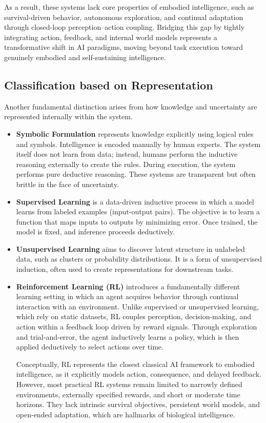 \documentclass[12pt]{article}
\begin{document}
As a result, these systems lack core properties of embodied intelligence, such as survival-driven behavior, autonomous exploration, and continual adaptation through closed-loop perception–action coupling. Bridging this gap by tightly integrating action, feedback, and internal world models represents a transformative shift in AI paradigms, moving beyond task execution toward genuinely embodied and self-sustaining intelligence.



\subsection{Classification based on Representation}
Another fundamental distinction arises from how knowledge and uncertainty are represented internally within the system.

\begin{itemize}
    \item \textbf{Symbolic Formulation} represents knowledge explicitly using logical rules and symbols. Intelligence is encoded manually by human experts. The system itself does not learn from data; instead, humans perform the inductive reasoning externally to create the rules. During execution, the system performs pure deductive reasoning. These systems are transparent but often brittle in the face of uncertainty.

    \item \textbf{Supervised Learning} is a data-driven inductive process in which a model learns from labeled examples (input-output pairs). The objective is to learn a function that maps inputs to outputs by minimizing error. Once trained, the model is fixed, and inference proceeds deductively.

    \item \textbf{Unsupervised Learning}  aims to discover latent structure in unlabeled data, such as clusters or probability distributions. It is a form of unsupervised induction, often used to create representations for downstream tasks.



    \item \textbf{Reinforcement Learning (RL)} introduces a fundamentally different learning setting in which an agent acquires behavior through continual interaction with an environment. Unlike supervised or unsupervised learning, which rely on static datasets, RL couples perception, decision-making, and action within a feedback loop driven by reward signals. Through exploration and trial-and-error, the agent inductively learns a policy, which is then applied deductively to select actions over time.
    
    Conceptually, RL represents the closest classical AI framework to embodied intelligence, as it explicitly models action, consequence, and delayed feedback. However, most practical RL systems remain limited to narrowly defined environments, externally specified rewards, and short or moderate time horizons. They lack intrinsic survival objectives, persistent world models, and open-ended adaptation, which are hallmarks of biological intelligence.

\end{itemize}
\end{document}
